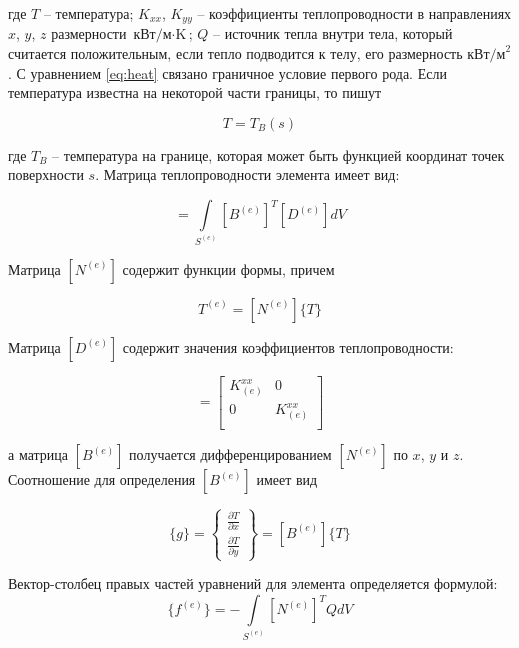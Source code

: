 \documentclass[a4paper, 14pt]{extarticle}
\begin{document}
где $T$ – температура; $K_{xx}$, $K_{yy}$ – коэффициенты теплопроводности в
направлениях $x$, $y$, $z$ размерности $ \text{кВт/м} \cdot \text{K} $; $Q$ –
источник тепла внутри тела, который считается положительным, если тепло
подводится к телу, его размерность $\text{кВт/м}^2$. С уравнением \ref{eq:heat}
связано граничное условие первого рода. Если температура известна на некоторой
части границы, то пишут

\begin{equation}
	T = T_B(s)
\end{equation}

где $T_B$ – температура на границе, которая может быть функцией координат точек
поверхности $s$. Матрица теплопроводности элемента имеет вид:

\begin{equation}
	[k^{(e)}] =
	\int\limits_{S^{(e)}} [B^{(e)}]^T [D^{(e)}] dV
\end{equation}

Матрица $[N^{(e)}]$ содержит функции формы, причем

\begin{equation}
	T^{(e)} = [N^{(e)}]\{T\}
\end{equation}

Матрица $[D^{(e)}]$ содержит значения коэффициентов теплопроводности:

\begin{equation}
	[D^{(e)}] = \begin{bmatrix}
		K_{(e)}^{xx} & 0            \\
		0            & K_{(e)}^{xx} \\
	\end{bmatrix}
\end{equation}

а матрица $[B^{(e)}]$ получается дифференцированием $[N^{(e)}]$ по $x$, $y$ и
$z$. Соотношение для определения $[B^{(e)}]$ имеет вид

\begin{equation}
	\{g\} = \begin{Bmatrix}
	\frac{\partial T}{\partial x} \\
	\frac{\partial T}{\partial y}
	\end{Bmatrix} = [B^{(e)}]\{T\}
\end{equation}


Вектор-столбец правых частей уравнений для элемента определяется формулой:
\begin{equation}
	\{f^{(e)}\} = - \int\limits_{S^{(e)}} [N^{(e)}]^T QdV
\end{equation}
\end{document}
